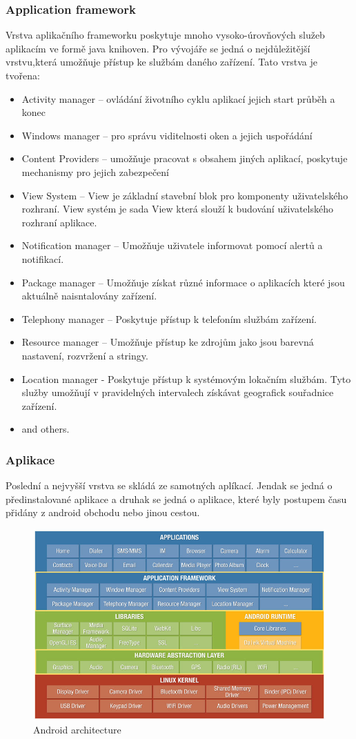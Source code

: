 \subsubsection{Application framework}
Vrstva aplikačního frameworku poskytuje mnoho vysoko-úrovňových služeb aplikacím ve formě java knihoven. Pro vývojáře se jedná o nejdůležitější vrstvu,která umožňuje přístup ke službám daného zařízení. Tato vrstva je tvořena: 
\begin{itemize} %
\item Activity manager -- ovládání životního cyklu aplikací jejich start průběh a konec
\item Windows manager -- pro správu viditelnosti oken a jejich uspořádání
\item Content Providers -- umožňuje pracovat s obsahem jiných aplikací, poskytuje mechanismy pro jejich zabezpečení 
\item View System -- View je základní stavební blok pro komponenty uživatelského rozhraní. View systém je sada View která slouží k budování uživatelského rozhraní aplikace.
\item Notification manager -- Umožňuje uživatele informovat pomocí alertů a notifikací.
\item Package manager -- Umožňuje získat různé informace o aplikacích které jsou aktuálně naisntalovány  zařízení.
\item Telephony manager -- Poskytuje přístup k telefoním službám zařízení. 
\item Resource manager -- Umožňuje přístup ke zdrojům jako jsou barevná nastavení, rozvržení a stringy.
\item Location manager - Poskytuje přístup k systémovým lokačním službám. Tyto služby umožňují v pravidelných intervalech získávat geografick souřadnice zařízení.
\item and others.
\end{itemize}

\subsubsection{Aplikace}
Poslední a nejvyšší vrstva se skládá ze samotných aplíkací. Jendak se jedná o předinstalované aplikace a druhak se jedná o aplikace, které byly postupem času přidány z android obchodu nebo jinou cestou.

\begin{figure}[h!]
    \centering
    \includegraphics[scale=0.5]{fig/android_architecture.jpg}
    \caption{Android architecture}
\end{figure}
